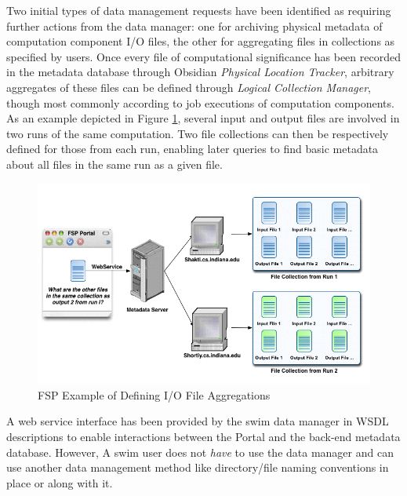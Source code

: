 Two initial types of data management requests have been identified as requiring
further actions from the data manager: one for archiving physical metadata of
computation component I/O files, the other for aggregating files in collections
as specified by users. Once every file of computational significance has been
recorded in the metadata database through Obsidian 
{\it Physical Location Tracker}, 
arbitrary aggregates of these files can be defined through
{\it Logical Collection Manager}, though most commonly according to job
executions of computation components.
As an example depicted in Figure \ref{fspcol}, several input and output files
are involved in two runs of the same computation. Two file collections
can then be respectively defined for those from each run,
enabling later queries to find basic metadata about all files in the same run
as a given file.
\begin{figure}
\includegraphics[scale=0.55]{file_collection.jpg}
\caption{FSP Example of Defining I/O File Aggregations}
\label{fspcol}
\end{figure}
A web service interface has been provided by the \ac{swim} data manager in
WSDL descriptions to enable interactions between the Portal and the back-end
metadata database. 
%
However, A \ac{swim} user does not {\em have} to use the data manager and can
use another data management method like directory/file naming conventions
in place or along with it.

